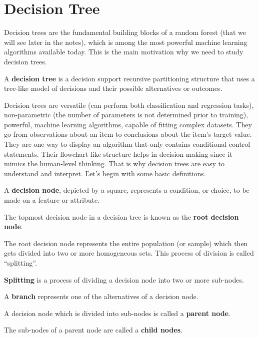 \newpage

\section{Decision Tree}

Decision trees are the fundamental building blocks of a random forest (that we will see later in the notes), which is
among the most powerful machine learning algorithms available today. This is the main motivation why we need to study
decision trees.

A \textbf{decision tree} is a decision support recursive partitioning structure that uses a tree-like model of
decisions and their possible alternatives or outcomes.
\ed

Decision trees are versatile (can perform both classification and regression tasks), non-parametric (the number of
parameters is not determined prior to training), powerful, machine learning algorithms, capable of fitting complex
datasets. They go from observations about an item to conclusions about the item's target value. They are one way to
display an algorithm that only contains conditional control statements. Their flowchart-like structure helps in
decision-making since it mimics the human-level thinking. That is why decision trees are easy to understand and
interpret. \v

Let's begin with some basic definitions.

A \textbf{decision node}, depicted by a square, represents a condition, or choice, to be made on a feature or attribute.
\ed

The topmost decision node in a decision tree is known as the \textbf{root decision node}.
\ed

The root decision node represents the entire population (or sample) which then gets divided into two or more homogeneous
sets. This process of division is called ``splitting''.

\bd[Splitting]
\textbf{Splitting} is a process of dividing a decision node into two or more sub-nodes.
\ed

\bd [Branch]
A \textbf{branch} represents one of the alternatives of a decision node.
\ed

A decision node which is divided into sub-nodes is called a \textbf{parent node}.
\ed

The sub-nodes of a parent node are called a \textbf{child nodes}.
\ed

